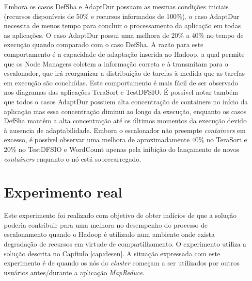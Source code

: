 Embora os casos DefSha e AdaptDur possuam as mesmas condições iniciais (recursos disponíveis de 50\% e recursos informados de 100\%), o caso AdaptDur necessita de menos tempo para concluir o processamento da aplicação em todas as aplicações. O caso AdaptDur possui uma melhora de 20\% a 40\% no tempo de execução quando comparado com o caso DefSha. A razão para este comportamento é a capacidade de adaptação inserida ao Hadoop, a qual permite que os Node Managers coletem a informação correta e à transmitam para o escalonador, que irá reorganizar a distribuição de tarefas à medida que as tarefas em execução são concluídas. Este comportamento é mais fácil de ser observado nos diagramas das aplicações TeraSort e TestDFSIO. É possível notar também que todos o casos AdaptDur possuem alta concentração de containers no início da aplicação mas essa concentração diminui ao longo da execução, enquanto os casos DefSha mantém a alta concentração até os últimos momentos da execução devido à ausencia de adaptabilidade. Embora o escalonador não preempte \textit{containers} em excesso, é possível observar uma melhora de aproximadamente 40\% no TeraSort e 20\% no TestDFSIO e WordCount apenas pela inibição do lançamento de novos \textit{containers} enquanto o nó está sobrecarregado.



\section{Experimento real}
\label{sec:expReal}
Este experimento foi realizado com objetivo de obter indícios de que a solução poderia contribuir para uma melhora no desempenho do processo de escalonamento quando o Hadoop é utilizado num ambiente onde exista degradação de recursos em virtude de compartilhamento. O experimento utiliza a solução descrita no Capítulo \ref{cap:desen}. A situação expressada com este experimento é de quando os nós do \textit{cluster} começam a ser utilizados por outros usuários antes/durante a aplicação \textit{MapReduce}.

